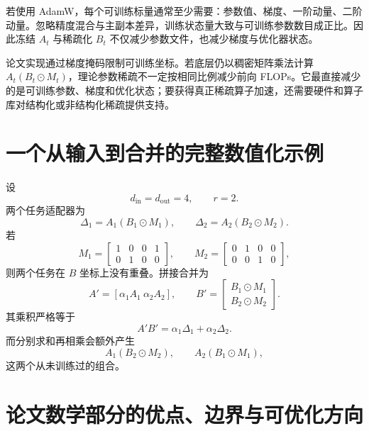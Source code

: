 \documentclass[UTF8,12pt,a4paper,fontset=none]{ctexart}
\numberwithin{equation}{section}
\begin{document}
若使用 AdamW，每个可训练标量通常至少需要：参数值、梯度、一阶动量、二阶动量。忽略精度混合与主副本差异，训练状态量大致与可训练参数数目成正比。因此冻结 $A_t$ 与稀疏化 $B_t$ 不仅减少参数文件，也减少梯度与优化器状态。

\begin{notebox}[训练稀疏与实际算力]
论文实现通过梯度掩码限制可训练坐标。若底层仍以稠密矩阵乘法计算 $A_t(B_t\odot M_t)$，理论参数稀疏不一定按相同比例减少前向 FLOPs。它最直接减少的是可训练参数、梯度和优化状态；要获得真正稀疏算子加速，还需要硬件和算子库对结构化或非结构化稀疏提供支持。
\end{notebox}

\section{一个从输入到合并的完整数值化示例}

设
\begin{equation}
  d_{\mathrm{in}}=d_{\mathrm{out}}=4,
  \qquad r=2.
\end{equation}
两个任务适配器为
\begin{equation}
  \Delta_1=A_1(B_1\odot M_1),
  \qquad
  \Delta_2=A_2(B_2\odot M_2).
\end{equation}
若
\begin{equation}
  M_1=\begin{bmatrix}1&0&0&1\\0&1&0&0\end{bmatrix},
  \qquad
  M_2=\begin{bmatrix}0&1&0&0\\0&0&1&0\end{bmatrix},
\end{equation}
则两个任务在 $B$ 坐标上没有重叠。拼接合并为
\begin{equation}
  A'=[\alpha_1A_1\ \alpha_2A_2],
  \qquad
  B'=\begin{bmatrix}
  B_1\odot M_1\\ B_2\odot M_2
  \end{bmatrix}.
\end{equation}
其乘积严格等于
\begin{equation}
  A'B'=\alpha_1\Delta_1+\alpha_2\Delta_2.
\end{equation}
而分别求和再相乘会额外产生
\begin{equation}
  A_1(B_2\odot M_2),
  \qquad
  A_2(B_1\odot M_1),
\end{equation}
这两个从未训练过的组合。

\section{论文数学部分的优点、边界与可优化方向}
\end{document}
